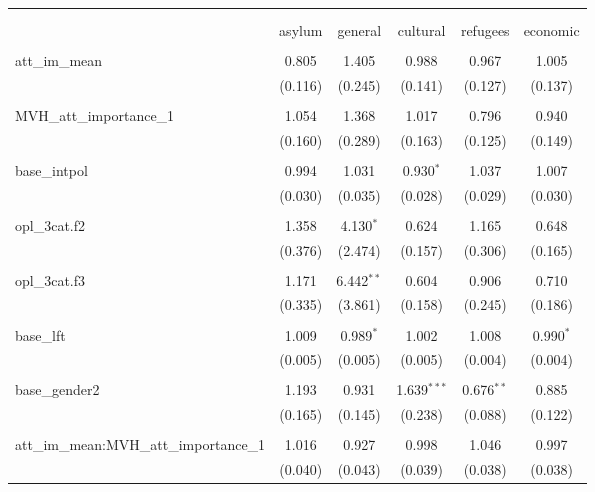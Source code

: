 
\begin{table}[!htbp] \centering 
  \caption{} 
  \label{} 
\begin{tabular}{@{\extracolsep{5pt}}lccccc} 
\\[-1.8ex]\hline 
\hline \\[-1.8ex] 
\\[-1.8ex] & asylum & general & cultural & refugees & economic \\ 
\hline \\[-1.8ex] 
 att\_im\_mean & 0.805 & 1.405 & 0.988 & 0.967 & 1.005 \\ 
  & (0.116) & (0.245) & (0.141) & (0.127) & (0.137) \\ 
  & & & & & \\ 
 MVH\_att\_importance\_1 & 1.054 & 1.368 & 1.017 & 0.796 & 0.940 \\ 
  & (0.160) & (0.289) & (0.163) & (0.125) & (0.149) \\ 
  & & & & & \\ 
 base\_intpol & 0.994 & 1.031 & 0.930$^{*}$ & 1.037 & 1.007 \\ 
  & (0.030) & (0.035) & (0.028) & (0.029) & (0.030) \\ 
  & & & & & \\ 
 opl\_3cat.f2 & 1.358 & 4.130$^{*}$ & 0.624 & 1.165 & 0.648 \\ 
  & (0.376) & (2.474) & (0.157) & (0.306) & (0.165) \\ 
  & & & & & \\ 
 opl\_3cat.f3 & 1.171 & 6.442$^{**}$ & 0.604 & 0.906 & 0.710 \\ 
  & (0.335) & (3.861) & (0.158) & (0.245) & (0.186) \\ 
  & & & & & \\ 
 base\_lft & 1.009 & 0.989$^{*}$ & 1.002 & 1.008 & 0.990$^{*}$ \\ 
  & (0.005) & (0.005) & (0.005) & (0.004) & (0.004) \\ 
  & & & & & \\ 
 base\_gender2 & 1.193 & 0.931 & 1.639$^{***}$ & 0.676$^{**}$ & 0.885 \\ 
  & (0.165) & (0.145) & (0.238) & (0.088) & (0.122) \\ 
  & & & & & \\ 
 att\_im\_mean:MVH\_att\_importance\_1 & 1.016 & 0.927 & 0.998 & 1.046 & 0.997 \\ 
  & (0.040) & (0.043) & (0.039) & (0.038) & (0.038) \\ 

\end{tabular}
\end{table}
